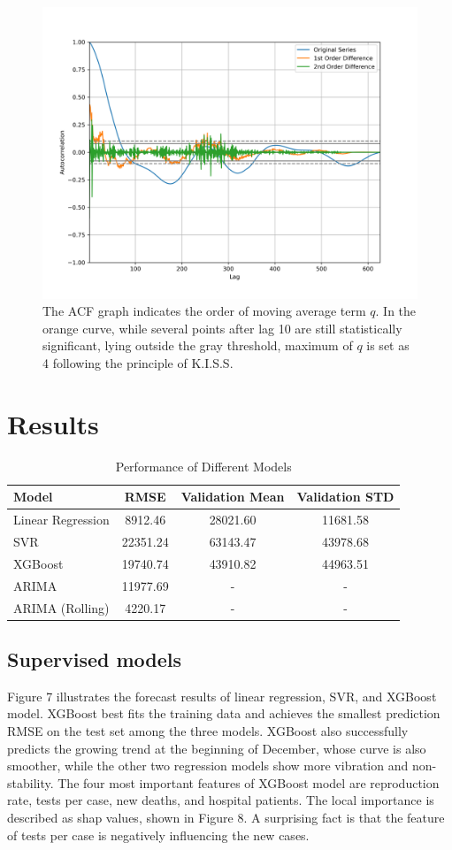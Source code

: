 \documentclass[11pt]{article}
\begin{document}
 
 
 \begin{figure}[htb]
 	\setlength{\abovecaptionskip}{0.cm}
 	\centering
 	\includegraphics[width=0.6\linewidth]{../figures/ACF.png} \vspace{-0.1in}
 	\caption{The ACF graph indicates the order of moving average term $q$. In the orange curve, while several points after lag 10 are still statistically significant, lying outside the gray threshold, maximum of $q$ is set as 4 following the principle of K.I.S.S. } 
 \end{figure}


\section{Results}
\begin{table}[htbp]
	\caption{Performance of Different Models}
	\centering
	\begin{tabular}{lccc}
		\toprule
		Model & RMSE& Validation Mean & Validation STD \\
		\midrule
		Linear Regression&8912.46&	28021.60&	11681.58
		\\
		SVR&	22351.24&	63143.47&43978.68
		\\
		XGBoost&19740.74&	43910.82&	44963.51
		\\
		ARIMA&	 11977.69&-&-
		\\
		ARIMA (Rolling)&	4220.17&-&-
		\\
		\bottomrule
	\end{tabular}
\end{table}
\subsection{Supervised models}
Figure 7 illustrates the forecast results of linear regression, SVR, and XGBoost model. XGBoost best fits the training data and achieves the smallest prediction RMSE on the test set among the three models. XGBoost also successfully predicts the growing trend at the beginning of December, whose curve is also smoother, while the other two regression models show more vibration and non-stability. The four most important features of XGBoost model are reproduction rate, tests per case, new deaths, and hospital patients. The local importance is described as shap values, shown in Figure 8. A surprising fact is that the feature of tests per case is negatively influencing the new cases.\\
\end{document}
